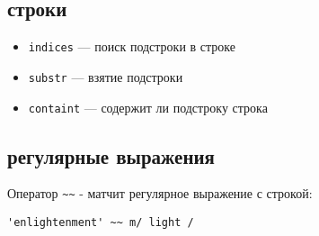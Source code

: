 \documentclass[12pt,a4paper,oneside,titlepage]{article}
\begin{document}
\begin{multicols*}{2}
  \subsection{строки}

  \begin{itemize}
    \item{\lstinline|indices|} --- поиск подстроки в строке
    \item{\lstinline|substr|} --- взятие подстроки
    \item{\lstinline|containt|} --- содержит ли подстроку строка
  \end{itemize}

  \subsection{регулярные выражения}

  Оператор \lstinline|~~| - матчит регулярное выражение с строкой:
  \begin{lstlisting}
'enlightenment' ~~ m/ light /
  \end{lstlisting}

\end{multicols*}
\end{document}
